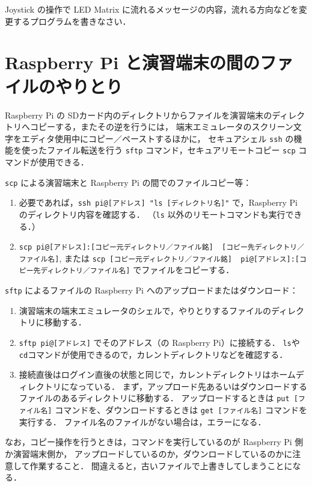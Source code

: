 \documentclass[11pt,a4,epsf]{article}
\begin{document}
\begin{excercise}
Joystick の操作で LED Matrix に流れるメッセージの内容，流れる方向などを変更するプログラムを書きなさい．
\end{excercise}


\section{Raspberry Pi と演習端末の間のファイルのやりとり}

Raspberry Pi の SDカード内のディレクトリからファイルを演習端末のディレクトリへコピーする，またその逆を行うには，
端末エミュレータのスクリーン文字をエディタ使用中にコピー／ペーストするほかに，
セキュアシェル \verb+ssh+ の機能を使ったファイル転送を行う \verb+sftp+ コマンド，セキュアリモートコピー \verb+scp+ コマンドが使用できる．

\verb+scp+ による演習端末と Raspberry Pi の間でのファイルコピー等：
\begin{enumerate}
\item
必要であれば，\verb+ssh pi@[アドレス] "ls [ディレクトリ名]"+ で，Raspberry Pi のディレクトリ内容を確認する．
（\verb+ls+ 以外のリモートコマンドも実行できる．）
\item
\verb+scp pi@[アドレス]:[コピー元ディレクトリ／ファイル銘]  [コピー先ディレクトリ／ファイル名]+, または
\verb+scp [コピー元ディレクトリ／ファイル銘]  pi@[アドレス]:[コピー先ディレクトリ／ファイル名]+ でファイルをコピーする．
\end{enumerate}

\verb+sftp+ によるファイルの Raspberry Pi へのアップロードまたはダウンロード：
\begin{enumerate}
\item
演習端末の端末エミュレータのシェルで，やりとりするファイルのディレクトリに移動する．
\item
\verb+sftp pi@[アドレス]+ でそのアドレス（の Raspberry Pi）に接続する．
\verb+ls+や\verb+cd+コマンドが使用できるので，カレントディレクトリなどを確認する．
\item
接続直後はログイン直後の状態と同じで，カレントディレクトリはホームディレクトリになっている．
まず，アップロード先あるいはダウンロードするファイルのあるディレクトリに移動する．
アップロードするときは \verb+put [ファイル名]+ コマンドを、ダウンロードするときは \verb+get [ファイル名]+ コマンドを実行する．
ファイル名のファイルがない場合は，エラーになる．
\end{enumerate}

なお，コピー操作を行うときは，コマンドを実行しているのが Raspberry Pi 側か演習端末側か，
アップロードしているのか，ダウンロードしているのかに注意して作業すること．
間違えると，古いファイルで上書きしてしまうことになる．
\end{document}
